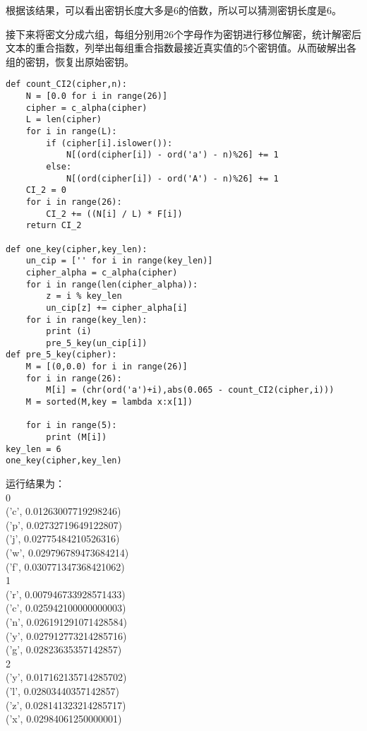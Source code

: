 \documentclass{article}
\begin{document}
根据该结果，可以看出密钥长度大多是6的倍数，所以可以猜测密钥长度是6。

接下来将密文分成六组，每组分别用26个字母作为密钥进行移位解密，统计解密后文本的重合指数，列举出每组重合指数最接近真实值的5个密钥值。从而破解出各组的密钥，恢复出原始密钥。

\begin{lstlisting}[title=key.py, frame=shadowbox]
def count_CI2(cipher,n):
    N = [0.0 for i in range(26)]
    cipher = c_alpha(cipher)
    L = len(cipher)
    for i in range(L):
        if (cipher[i].islower()):
            N[(ord(cipher[i]) - ord('a') - n)%26] += 1
        else:
            N[(ord(cipher[i]) - ord('A') - n)%26] += 1  
    CI_2 = 0
    for i in range(26):
        CI_2 += ((N[i] / L) * F[i])
    return CI_2

def one_key(cipher,key_len):
    un_cip = ['' for i in range(key_len)]   
    cipher_alpha = c_alpha(cipher)
    for i in range(len(cipher_alpha)): 
        z = i % key_len
        un_cip[z] += cipher_alpha[i]
    for i in range(key_len):
        print (i)
        pre_5_key(un_cip[i])     
def pre_5_key(cipher):
    M = [(0,0.0) for i in range(26)]
    for i in range(26):
        M[i] = (chr(ord('a')+i),abs(0.065 - count_CI2(cipher,i)))
    M = sorted(M,key = lambda x:x[1]) 

    for i in range(5):
        print (M[i])
key_len = 6
one_key(cipher,key_len)
\end{lstlisting}
运行结果为：\\
0\\
('c', 0.01263007719298246)\\
('p', 0.02732719649122807)\\
('j', 0.02775484210526316)\\
('w', 0.029796789473684214)\\
('f', 0.030771347368421062)\\
1\\
('r', 0.007946733928571433)\\
('c', 0.025942100000000003)\\
('n', 0.026191291071428584)\\
('y', 0.027912773214285716)\\
('g', 0.02823635357142857)\\
2\\
('y', 0.017162135714285702)\\
('l', 0.02803440357142857)\\
('z', 0.028141323214285717)\\
('x', 0.02984061250000001)\\
\end{document}

